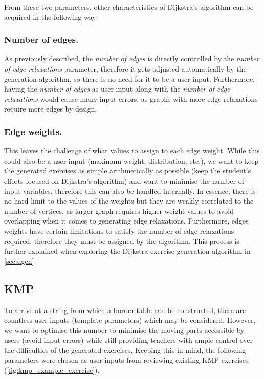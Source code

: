 \documentclass{l4proj}
\begin{document}
From these two parameters, other characteristics of Dijkstra's algorithm can be acquired in the following way:

\subsubsection{Number of edges.}
\label{sec:noe}

As previously described, the \emph{number of edges} is directly controlled by the \emph{number of edge relaxations} parameter, therefore it gets adjusted automatically by the generation algorithm, so there is no need for it to be a user input. Furthermore, having the \emph{number of edges} as user input along with the \emph{number of edge relaxations} would cause many input errors, as graphs with more edge relaxations require more edges by design. 

\subsubsection{Edge weights.}

This leaves the challenge of what values to assign to each edge weight. While this could also be a user input (maximum weight, distribution, etc.), we want to keep the generated exercises as simple arithmetically as possible (keep the student's efforts focused on Dijkstra's algorithm) and want to minimise the number of input variables, therefore this can also be handled internally. In essence, there is no hard limit to the values of the weights but they are weakly correlated to the number of vertices, as larger graph requires higher weight values to avoid overlapping when it comes to generating edge relaxations. Furthermore, edges weights have certain limitations to satisfy the number of edge relaxations required, therefore they must be assigned by the algorithm. This process is further explained when exploring the Dijkstra exercise generation algorithm in \autoref{sec:dgen}. 

\subsection{KMP}

To arrive at a string from which a border table can be constructed, there are countless user inputs (template parameters) which may be considered. However, we want to optimise this number to minimise the moving parts accessible by users (avoid input errors) while still providing teachers with ample control over the difficulties of the generated exercises. Keeping this in mind, the following parameters were chosen as user inputs from reviewing existing KMP exercises (\autoref{fig:kmp_example_exercise}).
\end{document}
